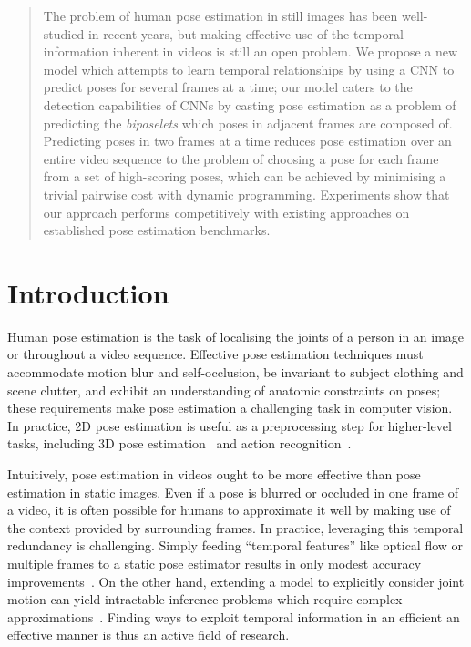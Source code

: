 \documentclass[runningheads]{llncs}
\begin{document}
\begin{abstract}
The problem of human pose estimation in still images has been well-studied in
recent years, but making effective use of the temporal information inherent in
videos is still an open problem. We propose a new model which attempts to learn
temporal relationships by using a CNN to predict poses for several frames at a
time; our model caters to the detection capabilities of CNNs by casting pose
estimation as a problem of predicting the \textit{biposelets} which poses in
adjacent frames are composed of. Predicting poses in two frames at a time
reduces pose estimation over an entire video sequence to the problem of choosing
a pose for each frame from a set of high-scoring poses, which can be achieved by
minimising a trivial pairwise cost with dynamic programming. Experiments show
that our approach performs competitively with existing approaches on established
pose estimation benchmarks.
\end{abstract}

\section{Introduction}

Human pose estimation is the task of localising the joints of a person in an
image or throughout a video sequence. Effective pose estimation techniques must
accommodate motion blur and self-occlusion, be invariant to subject clothing and
scene clutter, and exhibit an understanding of anatomic constraints on poses;
these requirements make pose estimation a challenging task in computer vision.
In practice, 2D pose estimation is useful as a preprocessing step for
higher-level tasks, including 3D pose
estimation~\cite{andriluka2010monocular,zhou2016spatio} and action
recognition~\cite{cheron2015p,yao2011does}.

Intuitively, pose estimation in videos ought to be more effective than pose
estimation in static images. Even if a pose is blurred or occluded in one frame
of a video, it is often possible for humans to approximate it well by making use
of the context provided by surrounding frames. In practice, leveraging this
temporal redundancy is challenging. Simply feeding ``temporal features'' like
optical flow or multiple frames to a static pose estimator results in only
modest accuracy improvements~\cite{jain2014modeep}. On the other hand, extending
a model to explicitly consider joint motion can yield intractable inference
problems which require complex approximations~\cite{cherian2014mixing}.
Finding ways to exploit temporal information in an efficient an effective manner
is thus an active field of research.
\end{document}
